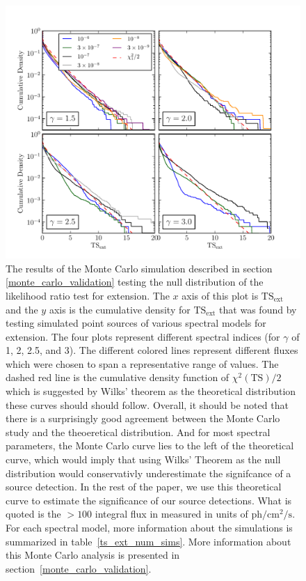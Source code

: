 \documentclass[12pt,preprint]{aastex}
\newcommand{\mev}{\text{MeV}\xspace}
\newcommand{\s}{\text{s}\xspace}
\newcommand{\ph}{\text{ph}\xspace}
\newcommand{\cm}{\text{cm}\xspace}
\newcommand{\tsext}{{\ensuremath{\text{TS}_\text{ext}}}\xspace}
\newcommand{\ts}{\text{TS}\xspace}
\begin{document}
\clearpage
\begin{figure}
  \begin{center}
    \includegraphics{mc_plots/ts_ext_emin_1000.pdf}
    \end{center}
    \caption{
    The results of the Monte Carlo simulation described in section
    \ref{monte_carlo_validation} testing the null distribution of
    the likelihood ratio test for extension.  The $x$ axis of this
    plot is \tsext and the $y$ axis is the cumulative density for
    \tsext that was found by testing simulated point sources of
    various spectral models for extension. The four plots represent
    different spectral indices (for $\gamma$ of 1, 2, 2.5, and 3).
    The different colored lines represent different fluxes which were
    chosen to span a representative range of values. The dashed
    red line is the cumulative density function of $\chi^2(\ts)/2$ which is
    suggested by Wilks' theorem as the theoretical distribution these
    curves should should follow.  Overall, it should be noted that there
    is a surprisingly good agreement between the Monte Carlo study and
    the theoeretical distribution. And for most spectral parameters, the
    Monte Carlo curve lies to the left of the theoretical curve, which
    would imply that using Wilks' Theorem as the null distribution would
    conservativly underestimate the signifcance of a source detection. In
    the rest of the paper, we use this theoretical curve to estimate
    the significance of our source detections.  What is quoted is the
    $>100$ \mev integral flux in measured in units of $\ph/\cm^2/\s$.
    For each spectral model, more information about the simulations is
    summarized in table~\ref{ts_ext_num_sims}. More
    information about this Monte Carlo analysis is presented in
    section~\ref{monte_carlo_validation}.
    }\label{ts_ext_mc}
  \end{figure}
\end{document}
